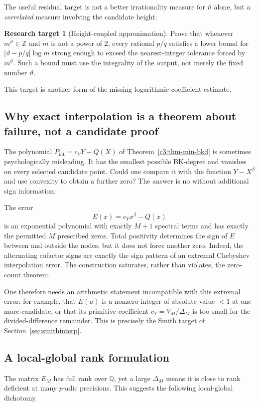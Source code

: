 \documentclass[11pt,oneside]{article}
\theoremstyle{definition}
\newtheorem{target}[theorem]{Research target}
\theoremstyle{remark}
\newcommand{\Z}{\mathbb Z}
\newcommand{\Q}{\mathbb Q}
\newcommand{\thetaq}{\vartheta}
\begin{document}
The useful residual target is not a better irrationality measure for $\thetaq$ alone, but a
\emph{correlated} measure involving the candidate height:
\begin{target}[Height-coupled approximation]
Prove that whenever $m^{\thetaq}\in\Z$ and $m$ is not a power of $2$, every rational $p/q$
satisfies a lower bound for
$|\thetaq-p/q|\log m$ strong enough to exceed the nearest-integer tolerance forced by
$m^{\thetaq}$.  Such a bound must use the integrality of the output, not merely the fixed
number $\thetaq$.
\end{target}
This target is another form of the missing logarithmic-coefficient estimate.

\subsection{Why exact interpolation is a theorem about failure, not a candidate proof}

The polynomial $P_{\mathrm{int}}=c_YY-Q(X)$ of
Theorem~\ref{c3:thm-min-bkd} is sometimes psychologically misleading.  It has the smallest
possible BK-degree and vanishes on every selected candidate point.  Could one compare it with
the function $Y-X^\beta$ and use convexity to obtain a further zero?  The answer is no without
additional sign information.

The error
\[
 E(x)=c_Yx^\beta-Q(x)
\]
is an exponential polynomial with exactly $M+1$ spectral terms and has exactly the permitted
$M$ prescribed zeros.  Total positivity determines the sign of $E$ between and outside the
nodes, but it does not force another zero.  Indeed, the alternating cofactor signs are exactly
the sign pattern of an extremal Chebyshev interpolation error.  The construction saturates,
rather than violates, the zero-count theorem.

One therefore needs an arithmetic statement incompatible with this extremal error: for
example, that $E(u)$ is a nonzero integer of absolute value $<1$ at one more candidate, or
that its primitive coefficient $c_Y=V_M/\Delta_M$ is too small for the divided-difference
remainder.  This is precisely the Smith target of Section~\ref{sec:smithinterp}.

\subsection{A local-global rank formulation}

The matrix $E_M$ has full rank over $\Q$, yet a large $\Delta_M$ means it is close to rank
deficient at many $p$-adic precisions.  This suggests the following local-global dichotomy.
\end{document}
